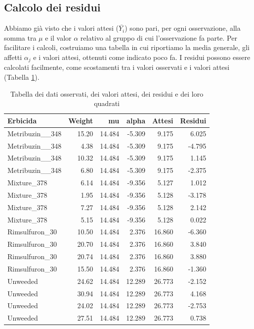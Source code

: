 \documentclass[a4paper,12pt,oneside]{book}
\begin{document}
\hypertarget{calcolo-dei-residui}{%
\subsection{Calcolo dei residui}\label{calcolo-dei-residui}}

Abbiamo già visto che i valori attesi (\(\bar{Y_i}\)) sono pari, per ogni osservazione, alla somma tra \(\mu\) e il valor \(\alpha\) relativo al gruppo di cui l'osservazione fa parte. Per facilitare i calcoli, costruiamo una tabella in cui riportiamo la media generale, gli affetti \(\alpha_j\) e i valori attesi, ottenuti come indicato poco fa. I residui possono essere calcolati facilmente, come scostamenti tra i valori osservati e i valori attesi (Tabella \ref{tab:tabResidui}).

\begin{table}

\caption{\label{tab:tabResidui}Tabella dei dati osservati, dei valori attesi, dei residui e dei loro quadrati}
\centering
\begin{tabular}[t]{lrrrrr}
\toprule
Erbicida & Weight & mu & alpha & Attesi & Residui\\
\midrule
Metribuzin\_\_348 & 15.20 & 14.484 & -5.309 & 9.175 & 6.025\\
Metribuzin\_\_348 & 4.38 & 14.484 & -5.309 & 9.175 & -4.795\\
Metribuzin\_\_348 & 10.32 & 14.484 & -5.309 & 9.175 & 1.145\\
Metribuzin\_\_348 & 6.80 & 14.484 & -5.309 & 9.175 & -2.375\\
Mixture\_378 & 6.14 & 14.484 & -9.356 & 5.127 & 1.012\\
\addlinespace
Mixture\_378 & 1.95 & 14.484 & -9.356 & 5.128 & -3.178\\
Mixture\_378 & 7.27 & 14.484 & -9.356 & 5.128 & 2.142\\
Mixture\_378 & 5.15 & 14.484 & -9.356 & 5.128 & 0.022\\
Rimsulfuron\_30 & 10.50 & 14.484 & 2.376 & 16.860 & -6.360\\
Rimsulfuron\_30 & 20.70 & 14.484 & 2.376 & 16.860 & 3.840\\
\addlinespace
Rimsulfuron\_30 & 20.74 & 14.484 & 2.376 & 16.860 & 3.880\\
Rimsulfuron\_30 & 15.50 & 14.484 & 2.376 & 16.860 & -1.360\\
Unweeded & 24.62 & 14.484 & 12.289 & 26.773 & -2.152\\
Unweeded & 30.94 & 14.484 & 12.289 & 26.773 & 4.168\\
Unweeded & 24.02 & 14.484 & 12.289 & 26.773 & -2.753\\
\addlinespace
Unweeded & 27.51 & 14.484 & 12.289 & 26.773 & 0.738\\
\bottomrule
\end{tabular}
\end{table}
\end{document}
